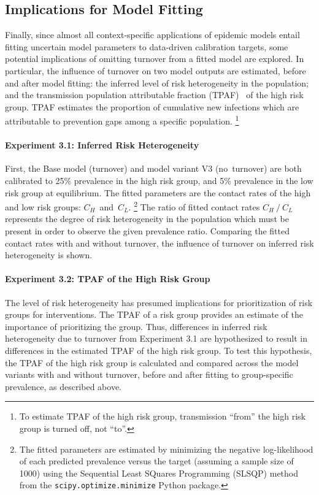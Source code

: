 \subsection{Implications for Model Fitting}\label{ss:exp-turnover-fit}
Finally, since almost all context-specific applications of epidemic models entail
fitting uncertain model parameters to data-driven calibration targets,
some potential implications of omitting turnover from a fitted model are explored.
In particular, the influence of turnover on two model outputs are estimated,
before and after model fitting:
the inferred level of risk heterogeneity in the population;
and the transmission population attributable fraction (TPAF)~\citep{Mishra2016}
of the high risk group.
TPAF estimates the proportion of cumulative new infections which are attributable to
prevention gaps among a specific population.%
\footnote{To estimate TPAF of the high risk group,
  transmission ``from'' the high risk group is turned off, not ``to''.}
\paragraph{Experiment 3.1: Inferred Risk Heterogeneity}
First, the Base model (turnover) and model variant V3 (no~turnover) are both calibrated to
25\% prevalence in the high risk group, and
5\% prevalence in the low risk group at equilibrium.
The fitted parameters are
the contact rates of the high and low risk groups: $C_H$~and~$C_L$.%
\footnote{The fitted parameters are estimated by minimizing
  the negative log-likelihood of each predicted prevalence versus the target
  (assuming a sample size of 1000)
  using the Sequential Least SQuares Programming (SLSQP) method~\citep{Kraft1988}
  from the \texttt{scipy.optimize.minimize} Python package.}
The ratio of fitted contact rates $C_H~/~C_L$
represents the degree of risk heterogeneity in the population
which must be present in order to observe the given prevalence ratio.
Comparing the fitted contact rates with and without turnover,
the influence of turnover on inferred risk heterogeneity is shown.
\paragraph{Experiment 3.2: TPAF of the High Risk Group}
The level of risk heterogeneity has presumed implications
for prioritization of risk groups for interventions.
The TPAF of a risk group provides an estimate of
the importance of prioritizing the group.
Thus, differences in inferred risk heterogeneity due to turnover from Experiment 3.1
are hypothesized to result in differences in the estimated TPAF of the high risk group.
To test this hypothesis, the TPAF of the high risk group
is calculated and compared across the model variants with and without turnover,
before and after fitting to group-specific prevalence, as described above.